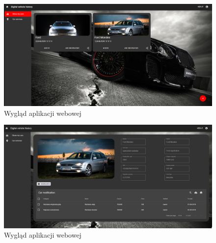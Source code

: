 \documentclass[12pt]{article}
\begin{document}
	\begin{figure}[H]
		\centering
		\includegraphics[scale=0.33]{app_web1.png}
		\caption{Wygląd aplikacji webowej}
		\label{app_webowa1}
	\end{figure}
		\begin{figure}[H]
		\centering
		\includegraphics[scale=0.33]{app_web2.png}
		\caption{Wygląd aplikacji webowej}
		\label{app_webowa2}
	\end{figure}
\end{document}
